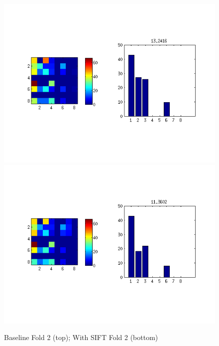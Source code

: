 \documentclass[10pt,twocolumn,letterpaper]{article}
\begin{document}
\begin{figure}[p]
 \centering
 \includegraphics[scale=0.5]{../../../evaluation/baseline/fold2_1e5.png}
 \includegraphics[scale=0.5]{../../../evaluation/feature-sift/fold2_1e5.png}
 \caption{Baseline Fold 2 (top); With SIFT Fold 2 (bottom)}
 \label{figure:withSiftFold2}
\end{figure}
\end{document}
